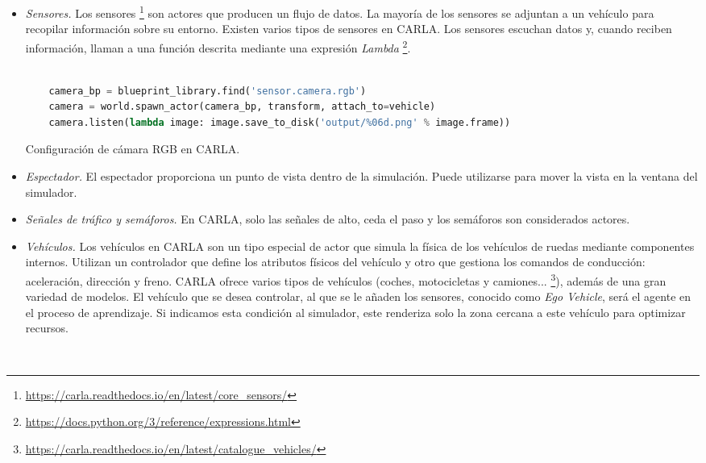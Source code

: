 \begin{itemize}
    \item \textit{Sensores.} Los sensores \footnote{\url{https://carla.readthedocs.io/en/latest/core_sensors/}} son actores que producen un flujo de datos. La mayoría de los sensores se adjuntan a un vehículo para recopilar información sobre su entorno. Existen varios tipos de sensores en CARLA. Los sensores escuchan datos y, cuando reciben información, llaman a una función descrita mediante una expresión \textit{Lambda} \footnote{\url{https://docs.python.org/3/reference/expressions.html}}. 

	\begin{code}[h]
	\begin{lstlisting}[language=python]
	
	camera_bp = blueprint_library.find('sensor.camera.rgb')
	camera = world.spawn_actor(camera_bp, transform, attach_to=vehicle)
	camera.listen(lambda image: image.save_to_disk('output/%06d.png' % image.frame))

	\end{lstlisting}
	\caption[Configuración de cámara RGB en CARLA]{Configuración de cámara RGB en CARLA.}
	\label{cod:camara_carla}
	\end{code}

    \item \textit{Espectador.} El espectador  proporciona un punto de vista dentro de la simulación. Puede utilizarse para mover la vista en la ventana del simulador.
    \item \textit{Señales de tráfico y semáforos.} En CARLA, solo las señales de alto, ceda el paso y los semáforos son considerados actores.

    \item  \textit{Vehículos.} Los vehículos en CARLA son un tipo especial de actor que simula la física de los vehículos de ruedas mediante componentes internos. Utilizan un controlador que define los atributos físicos del vehículo y otro que gestiona los comandos de conducción: aceleración, dirección y freno. CARLA ofrece varios tipos de vehículos (coches, motocicletas y camiones... \footnote{\url{https://carla.readthedocs.io/en/latest/catalogue_vehicles/}}), además de una gran variedad de modelos. El vehículo que se desea controlar, al que se le añaden los sensores, conocido como \textit{Ego Vehicle}, será el agente en el proceso de aprendizaje. Si indicamos esta condición al simulador, este renderiza solo la zona cercana a este vehículo para optimizar recursos.
	\begin{code}[h]
	\begin{lstlisting}[language=python]
	

\end{lstlisting}
\end{code}
\end{itemize}
